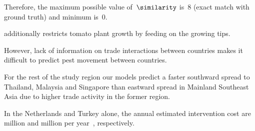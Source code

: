 Therefore, the maximum possible value
of~$\similarity$ is~$8$ (exact match with ground truth) and minimum is~$0$.

\tuta{} additionally restricts tomato plant growth by feeding
on the growing tips. 


 However, lack of information on trade interactions
between countries makes it difficult to predict pest movement between
countries.


For the rest of the study region our models
predict a faster southward spread to Thailand, Malaysia and Singapore than
eastward spread in Mainland Southeast Asia due to higher trade activity in
the former region. 

In the Netherlands and Turkey alone, the
annual estimated intervention cost are  million and 
million per year~\cite{}, respectively. 


